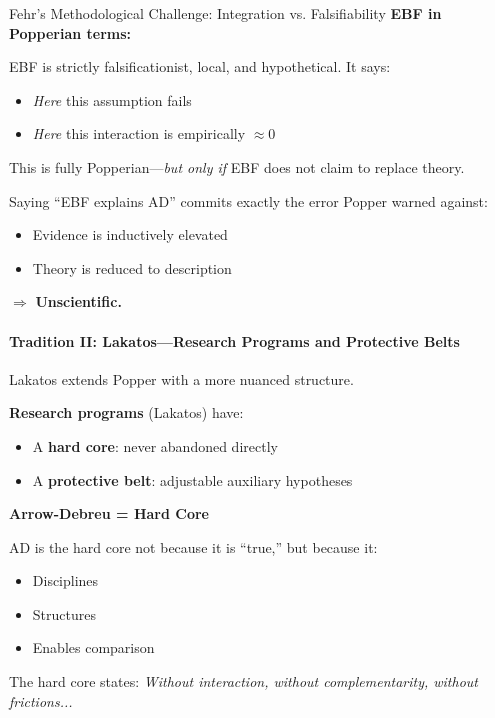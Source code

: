 \begin{chapter}{Fehr's Methodological Challenge: Integration vs. Falsifiability}
\textbf{EBF in Popperian terms:}

EBF is strictly falsificationist, local, and hypothetical. It says:
\begin{itemize}[noitemsep]
    \item \textit{Here} this assumption fails
    \item \textit{Here} this interaction is empirically $\approx 0$
\end{itemize}

This is fully Popperian---\textit{but only if} EBF does not claim to replace theory.

\begin{tcolorbox}[colback=red!5!white,colframe=red!75!black,title=\textbf{Popper's Warning (Directly Relevant)}]
Saying ``EBF explains AD'' commits exactly the error Popper warned against:
\begin{itemize}[noitemsep]
    \item Evidence is inductively elevated
    \item Theory is reduced to description
\end{itemize}
$\Rightarrow$ \textbf{Unscientific.}
\end{tcolorbox}

\paragraph{Tradition II: Lakatos---Research Programs and Protective Belts}

Lakatos extends Popper with a more nuanced structure.

\textbf{Research programs} (Lakatos) have:
\begin{itemize}[noitemsep]
    \item A \textbf{hard core}: never abandoned directly
    \item A \textbf{protective belt}: adjustable auxiliary hypotheses
\end{itemize}

\textbf{Arrow-Debreu = Hard Core}

AD is the hard core not because it is ``true,'' but because it:
\begin{itemize}[noitemsep]
    \item Disciplines
    \item Structures
    \item Enables comparison
\end{itemize}

The hard core states: \textit{Without interaction, without complementarity, without frictions...}


\end{chapter}
